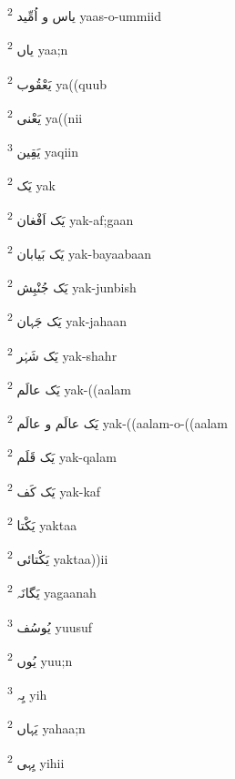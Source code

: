 \documentclass[12pt]{article}
\begin{document}
\begin{multicols}{5}
{\ur یاس و اُمِّید}   \textsuperscript{2} yaas-o-ummiid

{\ur یاں}   \textsuperscript{2} yaa;n

{\ur یَعْقُوب}   \textsuperscript{2} ya((quub

{\ur یَعْنی}   \textsuperscript{2} ya((nii

{\ur یَقِین}   \textsuperscript{3} yaqiin

{\ur یَک}   \textsuperscript{2} yak

{\ur یَک اَفْغان}   \textsuperscript{2} yak-af;gaan

{\ur یَک بَیابان}   \textsuperscript{2} yak-bayaabaan

{\ur یَک جُنْبِش}   \textsuperscript{2} yak-junbish

{\ur یَک جَہان}   \textsuperscript{2} yak-jahaan

{\ur یَک شَہْر}   \textsuperscript{2} yak-shahr

{\ur یَک عالَم}   \textsuperscript{2} yak-((aalam

{\ur یَک عالَم و عالَم}   \textsuperscript{2} yak-((aalam-o-((aalam

{\ur یَک قَلَم}   \textsuperscript{2} yak-qalam

{\ur یَک کَف}   \textsuperscript{2} yak-kaf

{\ur یَکْتا}   \textsuperscript{2} yaktaa

{\ur یَکْتائی}   \textsuperscript{2} yaktaa))ii

{\ur یَگانَہ}   \textsuperscript{2} yagaanah

{\ur یُوسُف}   \textsuperscript{3} yuusuf

{\ur یُوں}   \textsuperscript{2} yuu;n

{\ur یِہ}   \textsuperscript{3} yih

{\ur یَہاں}   \textsuperscript{2} yahaa;n

{\ur یِہی}   \textsuperscript{2} yihii



 

\end{multicols}
 
\end{document}
